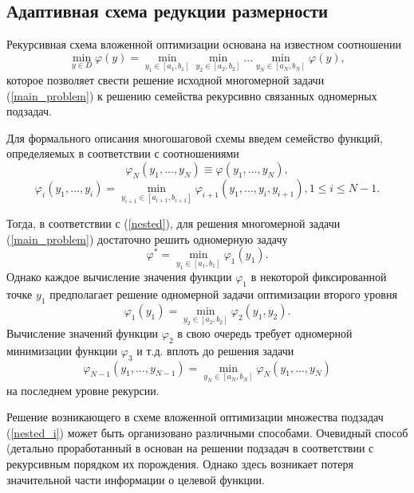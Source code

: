 \documentclass[entropy,article,submit,moreauthors,pdftex]{Definitions/mdpi}
\begin{document}
\subsection{Адаптивная схема редукции размерности }

Рекурсивная схема вложенной оптимизации основана на известном соотношении \cite{Grishagin2001} 
\begin{equation}\label{nested}
\min_{y \in D}\varphi(y) = \min_{y_1\in\left[a_1,b_1\right]}\min_{y_2\in\left[a_2,b_2\right]}...\min_{y_N\in\left[a_N,b_N\right]}\varphi(y),
\end{equation}
которое позволяет свести решение исходной многомерной задачи (\ref{main_problem}) к решению семейства рекурсивно связанных одномерных подзадач.

Для формального описания многошаговой схемы введем семейство функций, определяемых в соответствии с соотношениями 
\begin{equation}\label{nested_N}
\varphi_N(y_1,...,y_N) \equiv \varphi(y_1,...,y_N),
\end{equation}
\begin{equation}\label{nested_i}
\varphi_i(y_1,...,y_i) = \min_{ y_{i+1} \in\left[a_{i+1},b_{i+1}\right]} \varphi_{i+1}(y_1,...,y_i,y_{i+1}), 1\leq i\leq N-1.
\end{equation}

Тогда, в соответствии с (\ref{nested}), для решения многомерной задачи (\ref{main_problem}) достаточно решить одномерную задачу  
\begin{equation}\label{nested_1}
\varphi^* = \min_{y_1\in\left[a_1,b_1\right]}\varphi_1(y_1).
\end{equation}
Однако каждое вычисление значения функции $\varphi_1$ в некоторой фиксированной точке $y_1$ предполагает решение одномерной задачи оптимизации второго уровня 
\begin{equation}
\varphi_1(y_1) = \min_{y_2\in\left[a_2,b_2\right]}\varphi_2(y_1,y_2).
\end{equation}
Вычисление значений функции $\varphi_2$ в свою очередь требует одномерной минимизации функции $\varphi_3$ и т.д. вплоть до решения задачи
\begin{equation}
\varphi_{N-1}(y_1,...,y_{N-1}) = \min_{ y_{N} \in\left[a_{N},b_{N}\right]} \varphi_{N}(y_1,...,y_{N})
\end{equation}
на последнем уровне рекурсии.

Решение возникающего в схеме вложенной оптимизации множества подзадач (\ref{nested_i}) может быть организовано различными способами. 
Очевидный способ (детально проработанный в \cite{Grishagin2001,Grishagin2015} основан на решении подзадач в соответствии с рекурсивным порядком их порождения. Однако здесь возникает потеря значительной части информации о целевой функции. 
\end{document}
